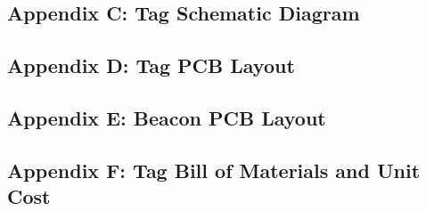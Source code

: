 \newpage
\vspace*{\fill}
\begin{center}
\subsection*{Appendix C: Tag Schematic Diagram}
\end{center}
\vspace*{\fill}


\newpage
\vspace*{\fill}
\begin{center}
\subsection*{Appendix D: Tag PCB Layout}
\end{center}
\vspace*{\fill}


\newpage
\vspace*{\fill}
\begin{center}
\subsection*{Appendix E: Beacon PCB Layout}
\end{center}
\vspace*{\fill}


\newpage
\vspace*{\fill}
\begin{center}
\subsection*{Appendix F: Tag Bill of Materials and Unit Cost}
\end{center}
\vspace*{\fill}

